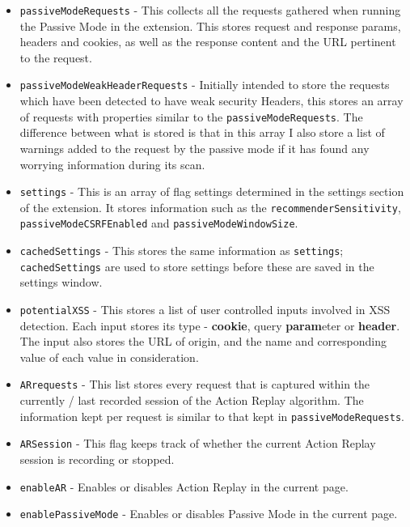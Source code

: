 \begin{itemize}
	\item \texttt{passiveModeRequests} - This collects all the requests gathered when running the Passive Mode in the extension. This stores request and response params, headers and cookies, as well as the response content and the URL pertinent to the request.
	
	\item \texttt{passiveModeWeakHeaderRequests} - Initially intended to store the requests which have been detected to have weak security Headers, this stores an array of requests with properties similar to the \texttt{passiveModeRequests}. The difference between what is stored is that in this array I also store a list of warnings added to the request by the passive mode if it has found any worrying information during its scan.
	
	\item \texttt{settings} - This is an array of flag settings determined in the settings section of the extension. It stores information such as the \texttt{recommenderSensitivity}, \texttt{passiveModeCSRFEnabled} and \texttt{passiveModeWindowSize}.
	
	\item \texttt{cachedSettings} - This stores the same information as \texttt{settings}; \texttt{cachedSettings} are used to store settings before these are saved in the settings window.
	
	\item \texttt{potentialXSS} - This stores a list of user controlled inputs involved in XSS detection. Each input stores its type - \textbf{cookie}, query \textbf{param}eter or \textbf{header}. The input also stores the URL of origin, and the name and corresponding value of each value in consideration.
	
	\item \texttt{ARrequests} - This list stores every request that is captured within the currently / last recorded session of the Action Replay algorithm. The information kept per request is similar to that kept in \texttt{passiveModeRequests}.
	
	\item \texttt{ARSession} - This flag keeps track of whether the current Action Replay session is recording or stopped.
	
	\item \texttt{enableAR} - Enables or disables Action Replay in the current page.
	
	\item \texttt{enablePassiveMode} - Enables or disables Passive Mode in the current page.
	
\end{itemize}

